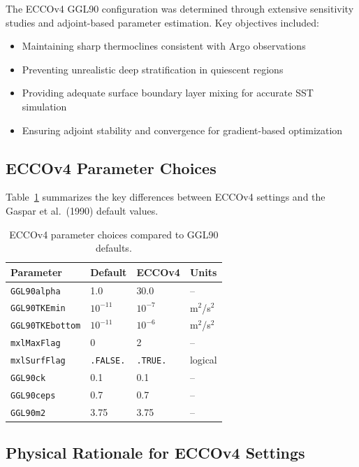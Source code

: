 \documentclass[12pt,letterpaper]{article}
\begin{document}
The ECCOv4 GGL90 configuration was determined through extensive sensitivity studies and adjoint-based parameter estimation. Key objectives included:
\begin{itemize}[leftmargin=*]
  \item Maintaining sharp thermoclines consistent with Argo observations
  \item Preventing unrealistic deep stratification in quiescent regions
  \item Providing adequate surface boundary layer mixing for accurate SST simulation
  \item Ensuring adjoint stability and convergence for gradient-based optimization
\end{itemize}

\subsection{ECCOv4 Parameter Choices}

Table~\ref{tab:eccov4_params} summarizes the key differences between ECCOv4 settings and the Gaspar et al.\ (1990) default values.

\begin{table}[h!]
\centering
\caption{ECCOv4 parameter choices compared to GGL90 defaults.}
\label{tab:eccov4_params}
\begin{tabular}{@{}llll@{}}
\toprule
\textbf{Parameter} & \textbf{Default} & \textbf{ECCOv4} & \textbf{Units} \\
\midrule
\texttt{GGL90alpha} & 1.0 & 30.0 & -- \\
\texttt{GGL90TKEmin} & $10^{-11}$ & $10^{-7}$ & m$^2$/s$^2$ \\
\texttt{GGL90TKEbottom} & $10^{-11}$ & $10^{-6}$ & m$^2$/s$^2$ \\
\texttt{mxlMaxFlag} & 0 & 2 & -- \\
\texttt{mxlSurfFlag} & \texttt{.FALSE.} & \texttt{.TRUE.} & logical \\
\texttt{GGL90ck} & 0.1 & 0.1 & -- \\
\texttt{GGL90ceps} & 0.7 & 0.7 & -- \\
\texttt{GGL90m2} & 3.75 & 3.75 & -- \\
\bottomrule
\end{tabular}
\end{table}

\subsection{Physical Rationale for ECCOv4 Settings}
\end{document}
